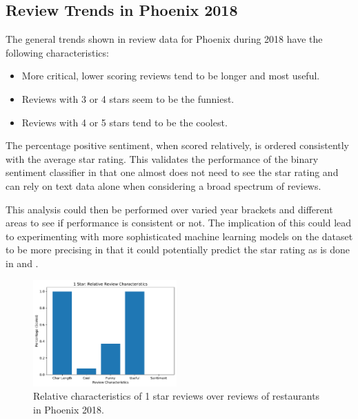 \subsection{Review Trends in Phoenix 2018}
\label{sec:resultReviews2018}



The general trends shown in review data for Phoenix during 2018 have the following characteristics:

\begin{itemize}
    \item More critical, lower scoring reviews tend to be longer and most useful.
    \item Reviews with 3 or 4 stars seem to be the funniest.
    \item Reviews with 4 or 5 stars tend to be the coolest.
\end{itemize}

The percentage positive sentiment, when scored relatively, is ordered consistently with the average star rating. This validates the performance of the binary sentiment classifier in that one almost does not need to see the star rating and can rely on text data alone when considering a broad spectrum of reviews.

This analysis could then be performed over varied year brackets and different areas to see if performance is consistent or not. The implication of this could lead to experimenting with more sophisticated machine learning models on the dataset to be more precising in that it could potentially predict the star rating as is done in \cite{reddy2017prediction} and \cite{monett2016predicting}.

\begin{figure}[h]
    \centering
    \includegraphics[width=0.49\textwidth]{img/phoenix2018/1Star.pdf}
    \caption{Relative characteristics of 1 star reviews over reviews of restaurants in Phoenix 2018.}
    \label{fig:1star}
\end{figure}

